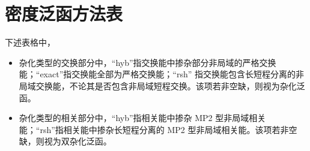 
\chapter{密度泛函方法表}
\label{sec.app.dft}

\begingroup
\setlength{\LTleft}{-20cm plus -1fill}
\setlength{\LTright}{\LTleft}

下述表格中，
\begin{itemize}[nosep]
    \item 杂化类型的交换部分中，“hyb”指交换能中掺杂部分非局域的严格交换能；“exact”指交换能全部为严格交换能；“rsh” 指交换能包含长短程分离的非局域交换能，不论其是否包含非局域短程交换。该项若非空缺，则视为杂化泛函。
    \item 杂化类型的相关部分中，“hyb”指相关能中掺杂 MP2 型非局域相关能；“rsh”指相关能中掺杂长短程分离的 MP2 型非局域相关能。该项若非空缺，则视为双杂化泛函。
\end{itemize}

